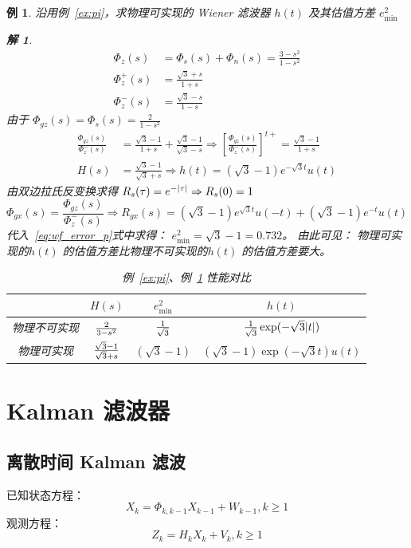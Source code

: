 \documentclass{ctexart}
\numberwithin{equation}{section}
\newtheorem{example}{例}
\newtheorem*{solution}{解}
\DeclarePairedDelimiter\abs{\lvert}{\rvert}
\begin{document}
\begin{example}\label{ex:pi2}
沿用例~\ref{ex:pi}，求物理可实现的 Wiener 滤波器 $h(t)$ 及其估值方差 $e^2_{\min}$
\begin{solution}
    \begin{align*}
    \Phi_z(s) & = \Phi_s(s) + \Phi_n(s) = \frac{3 - s^2}{1 - s^2} \\
    \Phi_z^+(s) & = \frac{\sqrt{3}+s}{1+s} \\
    \Phi_z^{-}(s) & = \frac{\sqrt{3} - s}{1 - s}    
    \end{align*}
    由于 $\Phi_{gz}(s) = \Phi_s(s) = \frac{2}{1 - s^2} $
    \begin{align*}
    \frac{\Phi_{gz}(s)}{\Phi_z^{-}(s)} & = \frac{\sqrt{3}-1}{1+s} + \frac{\sqrt{3}-1}{\sqrt{3}-s} \Rightarrow
    \left[\frac{\Phi_{gz}(s)}{\Phi_z^{-}(s)}\right]^{t+} = \frac{\sqrt{3}-1}{1+s} \\
    H(s) & = \frac{\sqrt{3}-1}{\sqrt{3}+s} \Rightarrow h(t) = (\sqrt{3} - 1) e^{-\sqrt{3} t} u(t)
    \end{align*}
    由双边拉氏反变换求得 $R_s(\tau) = e^{-\abs{\tau}} \Rightarrow R_s(0) = 1$ 
    $$
    \Phi_{gx}(s) = \frac{\Phi_{gz}(s)}{\Phi_z^{-}(s)} \Rightarrow R_{gx}(s) = (\sqrt{3}-1)e^{\sqrt{3} t} u(-t)+ (\sqrt{3}-1)e^{-t}u(t)
    $$
    代入~\eqref{eq:wf_error_p}式中求得：
    $ e^2_{\min} = \sqrt{3} - 1 = 0.732 $。
    由此可见： 物理可实现的$h(t)$ 的估值方差比物理不可实现的$h(t)$ 的估值方差要大。
    \begin{table}[!ht]
    \centering
    \begin{tabular}{cccc}
        \hline
        & $H(s)$ & $e^2_{\min}$ & $h(t)$  \\
        \hline
        物理不可实现 & ${2 \over 3-s^2}$ & ${1 \over \sqrt{3}}$ &$ {1 \over \sqrt{3} } \exp(-\sqrt{3} \abs{t} ) $ \\
        \hline
        物理可实现 & $ {\sqrt{3} - 1 \over \sqrt{3} + s} $ & $(\sqrt{3} - 1)$ & $ (\sqrt{3}-1)\exp(-\sqrt{3} t) u(t) $ \\
        \hline
    \end{tabular}
    \caption{例~\ref{ex:pi}、例~\ref{ex:pi2} 性能对比 }
    \end{table}
\end{solution}
\end{example}
\section{Kalman 滤波器}
\subsection{离散时间 Kalman 滤波}
已知状态方程：
\begin{equation}\label{eq:state}
X_k = \Phi_{k,k-1} X_{k-1} + W_{k-1}, k \geq 1
\end{equation}
观测方程： 
\begin{equation}\label{eq:observation}
Z_k = H_k X_k + V_k, k \geq 1
\end{equation}
\end{document}
